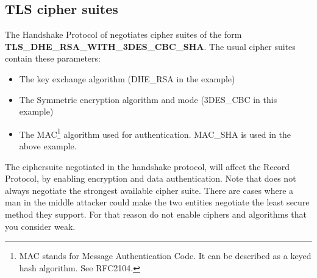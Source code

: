 \newpage
\subsection{TLS cipher suites}
\par 
The Handshake Protocol of \tlsI{} negotiates cipher suites 
of the form \\
{\bf TLS\_DHE\_RSA\_WITH\_3DES\_CBC\_SHA}.
The usual cipher suites contain these parameters:
\begin{itemize}
\item The key exchange algorithm (DHE\_RSA in the example)
\item The Symmetric encryption algorithm and mode (3DES\_CBC in this
example)
\item The MAC\footnote{MAC stands for Message Authentication Code. It can
be described as a keyed hash algorithm. See RFC2104.} algorithm used for authentication.
MAC\_SHA is used in the above example.
\end{itemize}

The ciphersuite negotiated in the handshake protocol, will affect 
the Record Protocol, by enabling encryption and data authentication.
Note that \tlsI{} does not always
negotiate the strongest available cipher suite. There are cases where
a man in the middle attacker could make the two entities negotiate
the least secure method they support. For that reason do not enable
ciphers and algorithms that you consider weak.

\addvspace{1.5cm}

